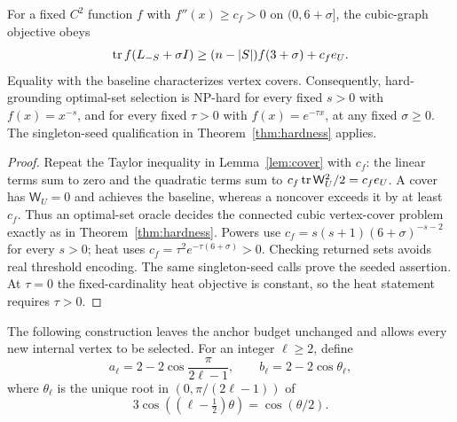 \begin{corollary}\label{cor:hardextended}
For a fixed $C^2$ function $f$ with $f''(x)\geq c_f>0$ on
$(0,6+\sigma]$, the cubic-graph objective obeys
\[
 \operatorname{tr} f(L_{-S}+\sigma I)\geq(n-|S|)f(3+\sigma)+c_f e_U.
\]
Equality with the baseline characterizes vertex covers. Consequently,
hard-grounding optimal-set selection is NP-hard for every fixed $s>0$
with $f(x)=x^{-s}$, and for every fixed $\tau>0$ with
$f(x)=e^{-\tau x}$, at any fixed $\sigma\geq0$.
The singleton-seed qualification in Theorem~\ref{thm:hardness} applies.
\end{corollary}
\begin{proof}
Repeat the Taylor inequality in Lemma~\ref{lem:cover} with $c_f$:
the linear terms sum to zero and the quadratic terms sum to
$c_f\operatorname{tr} \mathsf W_U^2/2=c_f e_U$. A cover has $\mathsf W_U=0$ and achieves the
baseline, whereas a noncover exceeds it by at least $c_f$.
Thus an optimal-set oracle decides the connected cubic vertex-cover
problem exactly as in Theorem~\ref{thm:hardness}. Powers use
$c_f=s(s+1)(6+\sigma)^{-s-2}$ for every $s>0$; heat uses
$c_f=\tau^2e^{-\tau(6+\sigma)}>0$. Checking returned sets avoids
real threshold encoding. The same singleton-seed calls prove the
seeded assertion. At $\tau=0$ the fixed-cardinality heat objective
is constant, so the heat statement requires $\tau>0$.
\end{proof}

The following construction leaves the anchor budget unchanged and
allows every new internal vertex to be selected. For an integer
$\ell\geq2$, define
\begin{equation}\label{eq:pathconstants}
 a_\ell=2-2\cos\frac{\pi}{2\ell-1},\qquad
 b_\ell=2-2\cos\theta_\ell,
\end{equation}
where $\theta_\ell$ is the unique root in
$(0,\pi/(2\ell-1))$ of
\begin{equation}\label{eq:pathroot}
 3\cos((\ell-\tfrac12)\theta)=\cos(\theta/2).
\end{equation}

